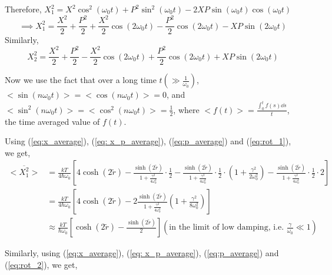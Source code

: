 \documentclass[12pt, twoside]{article}
\begin{document}
 Therefore, $X _ { 1 } ^ { 2 } =  X ^ { 2 } \cos ^ { 2 } \left( \omega _ { 0 } t \right) + P ^ { 2 } \sin ^ { 2 } ( \omega_0  t )  - 2 X P \sin ( \omega_0 t ) \cos \left( \omega _ { 0 } t \right) $
 \begin{equation}\label{eq:rot_1}
 \implies  X _ { 1 } ^ { 2 } = \frac { X ^ { 2 } } { 2 } + \frac { P ^ { 2 } } { 2 } + \frac { X ^ { 2 } } { 2 } \cos \left( 2 \omega _ { 0 } t \right) - \frac { P ^ { 2 } } { 2 } \cos \left( 2 \omega _ { 0 } t \right) - X P \sin(2\omega_0 t)
 \end{equation}
 Similarly,\begin{equation}\label{eq:rot_2}
 X _ { 2 } ^ { 2 } = \frac { X ^ { 2 } } { 2 } + \frac { P ^ { 2 } } { 2 } - \frac { X ^ { 2 } } { 2 } \cos \left( 2 \omega _ { 0 } t \right) + \frac { P ^ { 2 } } { 2 } \cos \left( 2 \omega _ { 0 } t \right) + X P \sin(2\omega_0 t)
 \end{equation}
 
 
 Now we use the fact that over a long time $t (\gg \frac{1}{\omega_0})$, $<\sin(n\omega_0 t)> = <\cos(n \omega_0 t)> = 0$, and $<\sin^2(n\omega_0 t)> = <\cos^2(n \omega_0 t)> = \frac{1}{2}$, where $<f(t)> = \frac{\int_{0}^{t} f(s) \dd{s}}{t}$, the time averaged value of $f(t)$.
 
 Using (\ref{eq:x_average}), (\ref{eq: x_p_average}), (\ref{eq:p_average}) and (\ref{eq:rot_1}), we get,\\
 $\begin{aligned}
 <\overline { X _ { 1 } ^ { 2 } } > &= \frac{kT}{4\hbar\omega_0}\left[4\cosh(2\tilde{r}) - \frac{\sinh(2\tilde{r})}{1+\frac{\gamma^2}{4\omega_0^2}}\cdot\frac{1}{2} - \frac{\sinh(2\tilde{r})}{1+\frac{\gamma^2}{4\omega_0^2}}\cdot\frac{1}{2}\cdot\left(1+\frac{\gamma^2}{2\omega_0^2}\right)-\frac{\sinh(2\tilde{r})}{1+\frac{\gamma^2}{4\omega_0^2}}\cdot\frac{1}{2}\cdot2 \right]
 \\ & = \frac{kT}{4\hbar\omega_0}\left[4\cosh(2\tilde{r}) - 2\frac{\sinh(2\tilde{r})}{1+\frac{\gamma^2}{4\omega_0^2}}\left(1+\frac{\gamma^2}{8\omega_0^2}\right) \right]
 \\ & \approx \frac{kT}{\hbar\omega_0}\left[\cosh(2\tilde{r}) - \frac{\sinh(2\tilde{r})}{2}\right] \left(\text{in the limit of low damping, i.e. } \frac{\gamma}{\omega_0} \ll 1\right)
 \end{aligned}$
 
 Similarly, using (\ref{eq:x_average}), (\ref{eq: x_p_average}), (\ref{eq:p_average}) and (\ref{eq:rot_2}), we get,
 
\end{document}
